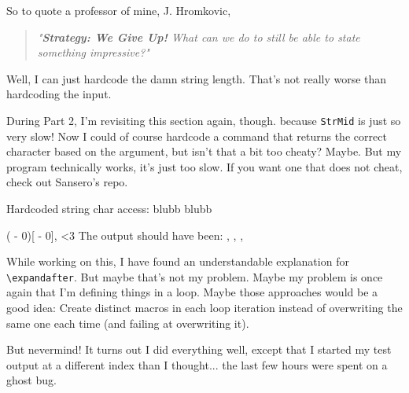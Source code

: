 \documentclass{article} \usepackage[utf8]{inputenc}
\newcommand{\code}[1]{\colorbox{codebggray}{{\texttt{#1}}}}
\begin{document}
So to quote a professor of mine, J. Hromkovic, 
\begin{quote}\textit{"\textbf{Strategy: We Give Up!} What can we do to still be able to state something impressive?"}\end{quote}
Well, I can just hardcode the damn string length. That's not really worse than hardcoding the input.

During Part 2, I'm revisiting this section again, though. because \code{StrMid} is just so very slow! Now I could of course hardcode a command that returns the correct character based on the argument, but isn't that a bit too cheaty? Maybe. But my program technically works, it's just too slow. If you want one that does not cheat, check out Sansero's repo.

\def\totalpos{3}
Hardcoded string char access: blubb \lucidcharat{\the\numexpr \totalpos - 0} blubb

\setcounter{tmpbctr}{-1}
\loop
{}
\edef\tmpinput{\the\numexpr \value{tmpbctr} - 0}
\def\tmpchar{\expandafter\lucidcharat\tmpinput}
(\tmpinput )[\tmpchar],
\ifnum \value{tmpbctr}<3
\repeat
The output should have been: , , ,

While working on this, I have found an understandable explanation for \code{\textbackslash expandafter}.
But maybe that's not my problem. Maybe my problem is once again that I'm defining things in a loop. Maybe those approaches would be a good idea: Create distinct macros in each loop iteration instead of overwriting the same one each time (and failing at overwriting it).

But nevermind! It turns out I did everything well, except that I started my test output at a different index than I thought... the last few hours were spent on a ghost bug.

\makeatletter
\def\einput#1{\@@input #1 \space}
\newcommand{\showexpanded}[1]{%
  \everyeof{\expandafter\@gobble\noexpand}%
  \long\edef\@tempcontents{#1}%
  \show\@tempcontents
}
\newcommand{\justexpanded}[1]{%
  \everyeof{\expandafter\@gobble\noexpand}%
  \long\edef\@tempcontents{#1}%
  \@tempcontents
}
\makeatother
\def\testingfile{\einput{testing.tex}}
%

\fi %
\end{document}
